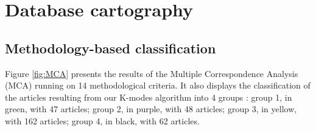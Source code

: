 \section{Database cartography}

\subsection{Methodology-based classification}

Figure \ref{fig:MCA}  presents the results of the Multiple Correspondence Analysis (MCA) running on 14 methodological criteria. It also displays the classification of the articles resulting from our K-modes algorithm into 4 groups : group 1, in green, with 47 articles; group 2, in purple, with 48 articles; group 3, in yellow, with 162 articles; group 4, in black, with 62 articles.


